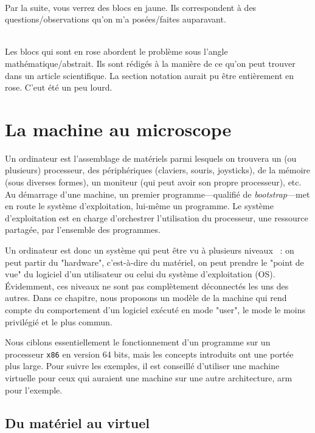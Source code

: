 \documentclass{book}
\newenvironment{commentaire}[1]{%
	\def\FrameCommand{\fboxrule=\FrameRule\fboxsep=\FrameSep \fcolorbox{yellow!50}{yellow!10}}%
	\MakeFramed {\advance\hsize-\width \FrameRestore}
	\noindent {\bf #1}\\
}%
{\endMakeFramed}
\newenvironment{formalisme}[1]{%
	\def\FrameCommand{\fboxrule=\FrameRule\fboxsep=\FrameSep \fcolorbox{red!10}{red!5}}%
	\MakeFramed {\advance\hsize-\width \FrameRestore}
	\noindent {\bf #1}\\
}%
{\endMakeFramed}
\newcommand{\xquatre}{{\tt x86}\xspace}
\begin{document}

\begin{commentaire}{Questions/observations}
	Par la suite, vous verrez des blocs en jaune. Ils correspondent à des questions/observations qu'on m'a posées/faites auparavant. 
\end{commentaire}

\begin{formalisme}{Formalisme}
	Les blocs qui sont en rose abordent le problème sous l'angle mathématique/abstrait. Ils sont rédigés à la manière de ce qu'on peut trouver dans un article scientifique. La section notation aurait pu être entièrement en rose. C'eut été un peu lourd.
\end{formalisme}


\chapter{La machine au microscope}

Un ordinateur est l'assemblage de matériels parmi lesquels on trouvera un (ou plusieurs) processeur, des périphériques (claviers, souris, joysticks), de la mémoire (sous diverses formes), un moniteur (qui peut avoir son propre processeur), etc. Au démarrage d'une machine, un premier programme---qualifié de \emph{bootstrap}---met en route le système d'exploitation, lui-même un programme. Le système d'exploitation est en charge d'orchestrer l'utilisation du processeur, une ressource partagée, par l'ensemble des programmes. 

Un ordinateur est donc un système qui peut être vu à plusieurs niveaux~ : on peut partir du "hardware", c'est-à-dire du matériel, on peut prendre le "point de vue" du logiciel d'un utilisateur ou celui du système d'exploitation (OS). \'Evidemment, ces niveaux ne sont pas complètement déconnectés les uns des autres. Dans ce chapitre, nous proposons un modèle de la machine qui rend compte du comportement d'un logiciel exécuté en mode "user", le mode le moins privilégié et le plus commun.

Nous ciblons essentiellement le fonctionnement d'un programme sur un processeur \xquatre en version 64 bits, mais les concepts introduits ont une portée plus large. Pour suivre les exemples, il est conseillé d'utiliser une machine virtuelle pour ceux qui auraient une machine sur une autre architecture, {\sc arm} pour l'exemple. 


\section{Du matériel au virtuel}
\end{document}
